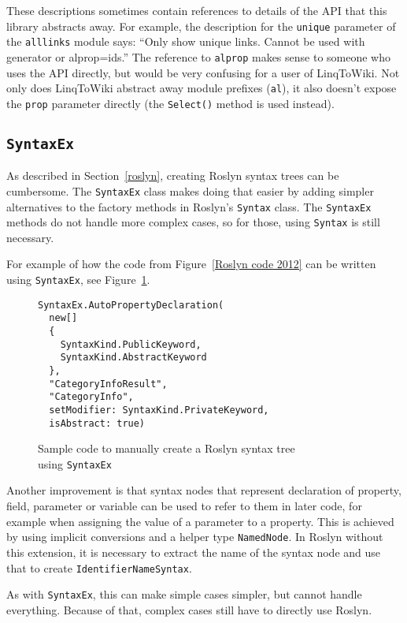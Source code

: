 These descriptions sometimes contain references to details of the \ac{API} that this library abstracts away.
For example, the description for the \texttt{unique} parameter of the \lstinline{alllinks} module says:
“Only show unique links. Cannot be used with generator or alprop=ids.”
The reference to \texttt{alprop} makes sense to someone who uses the \ac{API} directly,
but would be very confusing for a user of LinqToWiki.
Not only does LinqToWiki abstract away module prefixes (\texttt{al}),
it also doesn't expose the \texttt{prop} parameter directly
(the \lstinline{Select()} method is used instead).

\subsection{\texorpdfstring{\lstinline{SyntaxEx}}{SyntaxEx}}

As described in Section~\ref{roslyn}, creating Roslyn syntax trees can be cumbersome.
The \lstinline{SyntaxEx} class makes doing that easier by adding simpler alternatives
to the factory methods in Roslyn's \lstinline{Syntax} class.
The \lstinline{SyntaxEx} methods do not handle more complex cases,
so for those, using \lstinline{Syntax} is still necessary.

For example of how the code from Figure~\ref{Roslyn code 2012} can be written using \lstinline{SyntaxEx},
see Figure~\ref{SyntaxEx code}.

\begin{figure}[htbp]

\begin{lstlisting}
SyntaxEx.AutoPropertyDeclaration(
  new[]
  {
    SyntaxKind.PublicKeyword,
    SyntaxKind.AbstractKeyword
  },
  "CategoryInfoResult",
  "CategoryInfo",
  setModifier: SyntaxKind.PrivateKeyword,
  isAbstract: true)
\end{lstlisting}

\caption{Sample code to manually create a Roslyn syntax tree \\ using \lstinline{SyntaxEx}}
\label{SyntaxEx code}
\end{figure}

\medskip

Another improvement is that syntax nodes that represent declaration of property, field, parameter or variable
can be used to refer to them in later code, for example when assigning the value of a parameter to a property.
This is achieved by using implicit conversions and a helper type \lstinline{NamedNode}.
In Roslyn without this extension, it is necessary to extract the name of the syntax node
and use that to create \lstinline{IdentifierNameSyntax}.

As with \lstinline{SyntaxEx}, this can make simple cases simpler, but cannot handle everything.
Because of that, complex cases still have to directly use Roslyn.
